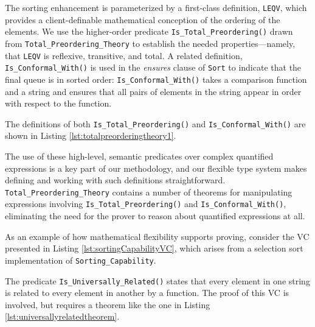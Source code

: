 

The sorting enhancement is parameterized by a first-class definition, \texttt{LEQV}, which provides a client-definable mathematical conception of the ordering of the elements.  We use the higher-order predicate \texttt{Is\_Total\_Preordering()} drawn from \texttt{Total\_Preordering\_Theory} to establish the needed properties---namely, that \texttt{LEQV} is reflexive, transitive, and total.  A related definition, \texttt{Is\_Conformal\_With()} is used in the \emph{ensures} clause of \texttt{Sort} to indicate that the final queue is in sorted order: \texttt{Is\_Conformal\_With()} takes a comparison function and a string and ensures that all pairs of elements in the string appear in order with respect to the function.

The definitions of both \texttt{Is\_Total\_Preordering()} and \texttt{Is\_Conformal\_With()} are shown in Listing \ref{lst:totalpreorderingtheory1}.



The use of these high-level, semantic predicates over complex quantified expressions is a key part of our methodology, and our flexible type system makes defining and working with such definitions straightforward.  \texttt{Total\_Preordering\_Theory} contains a number of theorems for manipulating expressions involving \texttt{Is\_Total\_Preordering()} and \texttt{Is\_Conformal\_With()}, eliminating the need for the prover to reason about quantified expressions at all.  

As an example of how mathematical flexibility supports proving, consider the VC presented in Listing \ref{lst:sortingCapabilityVC}, which arises from a selection sort implementation of \texttt{Sorting\_Capability}.



The predicate \texttt{Is\_Universally\_Related()} states that every element in one string is related to every element in another by a function.  The proof of this VC is involved, but requires a theorem like the one in Listing \ref{lst:universallyrelatedtheorem}.

